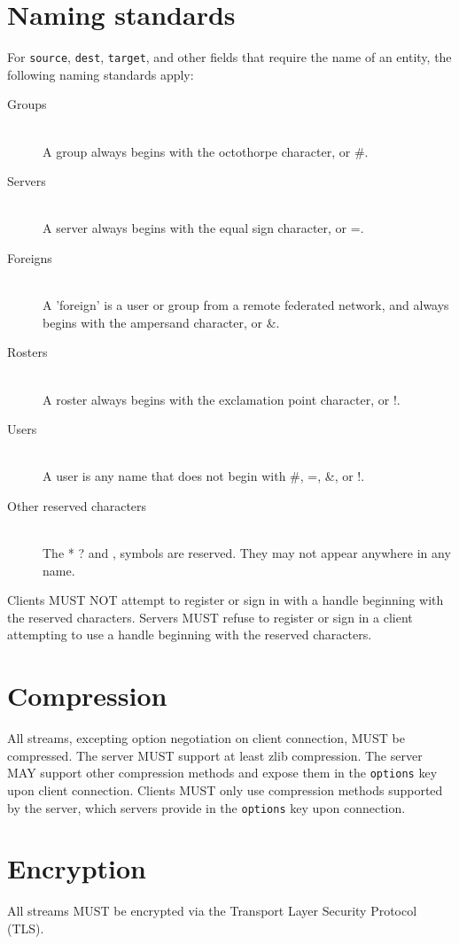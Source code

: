 \section{Naming standards}
\sectionrule
For \texttt{source}, \texttt{dest}, \texttt{target}, and other fields that
require the name of an entity, the following naming standards apply:

\begin{description}
\item[Groups] \hfill \\
A group always begins with the octothorpe character, or \#.

\item[Servers] \hfill \\
A server always begins with the equal sign character, or =.

\item[Foreigns] \hfill \\
A 'foreign' is a user or group from a remote federated network, and always
begins with the ampersand character, or \&.

\item[Rosters] \hfill \\
A roster always begins with the exclamation point character, or !.

\item[Users] \hfill \\
A user is any name that does not begin with \#, =, \&, or !.

\item[Other reserved characters] \hfill \\
The * ? and , symbols are reserved.  They may not appear anywhere in any name.

\end{description}

Clients MUST NOT attempt to register or sign in with a handle beginning with the
reserved characters.  Servers MUST refuse to register or sign in a client
attempting to use a handle beginning with the reserved characters.



\section{Compression}
\sectionrule

All streams, excepting option negotiation on client connection, MUST be
compressed.  The server MUST support at least zlib compression.  The server MAY
support other compression methods and expose them in the \texttt{options} key
upon client connection.  Clients MUST only use compression methods supported by
the server, which servers provide in the \texttt{options} key upon connection.



\section{Encryption}
\sectionrule

All streams MUST be encrypted via the Transport Layer Security Protocol (TLS).
\cite{TLS}
